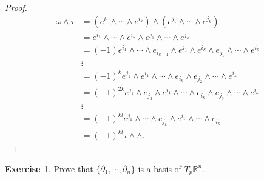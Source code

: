 \documentclass[12pt, psamsfonts]{amsart}
\theoremstyle{definition}
\newtheorem{exer}[thm]{Exercise}
\theoremstyle{remark}
\numberwithin{equation}{section}
\begin{document}
\begin{proof}
  \begin{align*}
    \omega \wedge \tau
      &= (e^{i_1} \wedge \cdots \wedge e^{i_k}) \wedge (e^{j_1} \wedge \cdots \wedge e^{j_k}) \\
      &= e^{i_1} \wedge \cdots \wedge e^{i_k} \wedge e^{j_1} \wedge \cdots \wedge e^{j_k} \\
      &= (-1) e^{i_1} \wedge \cdots \wedge e_{i_{k - 1}} \wedge e^{j_1} \wedge e^{i_k} \wedge e_{j_1} \wedge \cdots \wedge e^{i_k} \\
      &\vdots \\
      &= (-1)^k e^{j_1} \wedge e^{i_1} \wedge \cdots \wedge e_{i_k} \wedge e_{j_2} \wedge \cdots \wedge e^{i_k} \\
      &= (-1)^{2k} e^{j_1} \wedge e_{j_2} \wedge e^{i_1} \wedge \cdots \wedge e_{i_k} \wedge e_{j_3} \wedge \cdots \wedge e^{i_k} \\
      &\vdots \\
      &= (-1)^{kl} e^{j_1} \wedge \cdots \wedge e_{j_k} \wedge e^{i_1} \wedge \cdots \wedge e_{i_k} \\
      &= (-1)^{kl} \tau \wedge \wedge.
  \end{align*}
\end{proof}


\begin{exer}
  Prove that $\{ \partial_1, \cdots, \partial_n \}$ is a basis of $T_p \mathbb{R}^n$.
\end{exer}
\end{document}

